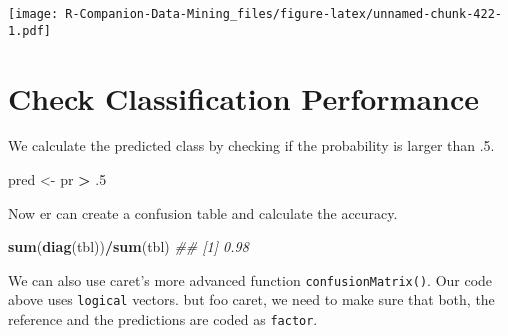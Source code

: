 \documentclass[
  notitlepage]{book}
\newenvironment{Shaded}{\begin{snugshade}}{\end{snugshade}}
\newcommand{\CommentTok}[1]{\textcolor[rgb]{0.56,0.35,0.01}{\textit{#1}}}
\newcommand{\DataTypeTok}[1]{\textcolor[rgb]{0.13,0.29,0.53}{#1}}
\newcommand{\DecValTok}[1]{\textcolor[rgb]{0.00,0.00,0.81}{#1}}
\newcommand{\FloatTok}[1]{\textcolor[rgb]{0.00,0.00,0.81}{#1}}
\newcommand{\KeywordTok}[1]{\textcolor[rgb]{0.13,0.29,0.53}{\textbf{#1}}}
\newcommand{\NormalTok}[1]{#1}
\newcommand{\OperatorTok}[1]{\textcolor[rgb]{0.81,0.36,0.00}{\textbf{#1}}}
\newcommand{\StringTok}[1]{\textcolor[rgb]{0.31,0.60,0.02}{#1}}
\begin{document}
\texttt{[image: R-Companion-Data-Mining\_files/figure-latex/unnamed-chunk-422-1.pdf]}

\hypertarget{check-classification-performance}{%
\section{Check Classification Performance}\label{check-classification-performance}}

We calculate the predicted class by checking if the probability is larger than
.5.

\begin{Shaded}
\begin{Highlighting}[]
\NormalTok{pred \textless{}{-}}\StringTok{ }\NormalTok{pr }\OperatorTok{\textgreater{}}\StringTok{ }\FloatTok{.5}
\end{Highlighting}
\end{Shaded}

Now er can create a confusion table and calculate the accuracy.

\begin{Shaded}
\end{Shaded}

\begin{Shaded}
\begin{Highlighting}[]
\KeywordTok{sum}\NormalTok{(}\KeywordTok{diag}\NormalTok{(tbl))}\OperatorTok{/}\KeywordTok{sum}\NormalTok{(tbl)}
\CommentTok{\#\# [1] 0.98}
\end{Highlighting}
\end{Shaded}

We can also use caret's more advanced function \texttt{confusionMatrix()}. Our code
above uses \texttt{logical} vectors.
but foo caret, we need to make sure that both, the reference and the predictions
are coded as \texttt{factor}.
\end{document}
